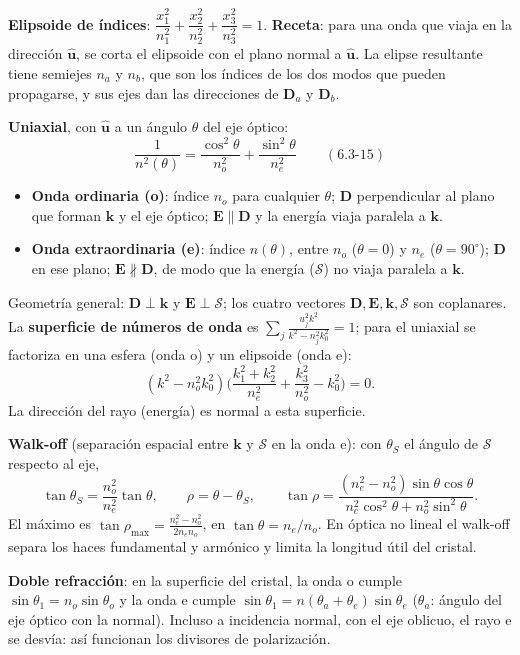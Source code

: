 \documentclass[10pt]{article}
\newcommand{\Sc}{\boldsymbol{\mathcal S}}
\newcommand{\E}{\mathbf E}
\newcommand{\D}{\mathbf D}
\newcommand{\kv}{\mathbf k}
\newcommand{\ud}{\hat{\mathbf u}}
\begin{document}
\begin{clave}[title={Elipsoide de índices y cristal uniaxial}]
\textbf{Elipsoide de índices}: $\dfrac{x_1^2}{n_1^2}+\dfrac{x_2^2}{n_2^2}+\dfrac{x_3^2}{n_3^2}=1$. \textbf{Receta}: para una onda que viaja en la dirección $\ud$, se corta el elipsoide con el plano normal a $\ud$. La elipse resultante tiene semiejes $n_a$ y $n_b$, que son los índices de los dos modos que pueden propagarse, y sus ejes dan las direcciones de $\D_a$ y $\D_b$.

\textbf{Uniaxial}, con $\ud$ a un ángulo $\theta$ del eje óptico:
\[
\frac{1}{n^2(\theta)}=\frac{\cos^2\theta}{n_o^2}+\frac{\sin^2\theta}{n_e^2}\qquad(6.3\text{-}15)
\]
\begin{itemize}[leftmargin=1.2em]
\item \textbf{Onda ordinaria (o)}: índice $n_o$ para cualquier $\theta$; $\D$ perpendicular al plano que forman $\kv$ y el eje óptico; $\E\parallel\D$ y la energía viaja paralela a $\kv$.
\item \textbf{Onda extraordinaria (e)}: índice $n(\theta)$, entre $n_o$ ($\theta=0$) y $n_e$ ($\theta=90^\circ$); $\D$ en ese plano; $\E\not\parallel\D$, de modo que la energía ($\Sc$) no viaja paralela a $\kv$.
\end{itemize}
\end{clave}

Geometría general: $\D\perp\kv$ y $\E\perp\Sc$; los cuatro vectores $\D,\E,\kv,\Sc$ son coplanares. La \textbf{superficie de números de onda} es $\sum_j\frac{u_j^2k^2}{k^2-n_j^2k_0^2}=1$; para el uniaxial se factoriza en una esfera (onda o) y un elipsoide (onda e):
\[
(k^2-n_o^2k_0^2)\Big(\frac{k_1^2+k_2^2}{n_e^2}+\frac{k_3^2}{n_o^2}-k_0^2\Big)=0 .
\]
La dirección del rayo (energía) es normal a esta superficie.

\textbf{Walk-off} (separación espacial entre $\kv$ y $\Sc$ en la onda e): con $\theta_S$ el ángulo de $\Sc$ respecto al eje,
\[
\tan\theta_S=\frac{n_o^2}{n_e^2}\tan\theta,\qquad \rho=\theta-\theta_S,\qquad
\tan\rho=\frac{(n_e^2-n_o^2)\sin\theta\cos\theta}{n_e^2\cos^2\theta+n_o^2\sin^2\theta}.
\]
El máximo es $\tan\rho_{\max}=\frac{n_e^2-n_o^2}{2n_en_o}$, en $\tan\theta=n_e/n_o$. En óptica no lineal el walk-off separa los haces fundamental y armónico y limita la longitud útil del cristal.

\textbf{Doble refracción}: en la superficie del cristal, la onda o cumple $\sin\theta_1=n_o\sin\theta_o$ y la onda e cumple $\sin\theta_1=n(\theta_a+\theta_e)\sin\theta_e$ ($\theta_a$: ángulo del eje óptico con la normal). Incluso a incidencia normal, con el eje oblicuo, el rayo e se desvía: así funcionan los divisores de polarización.
\end{document}
